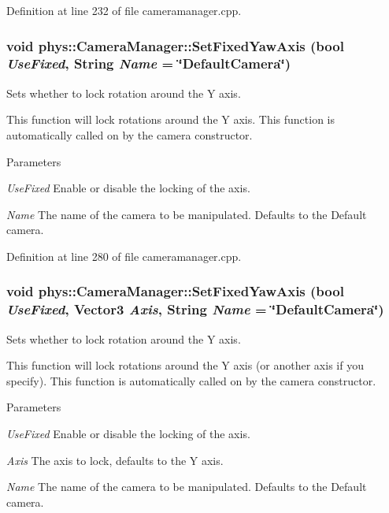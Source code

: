 Definition at line 232 of file cameramanager.cpp.

\hypertarget{classphys_1_1CameraManager_aa7370f2239e88ab151b72c4171afea07}{
\subsubsection[{SetFixedYawAxis}]{\setlength{\rightskip}{0pt plus 5cm}void phys::CameraManager::SetFixedYawAxis (bool {\em UseFixed}, \/  {\bf String} {\em Name} = {\ttfamily \char`\"{}DefaultCamera\char`\"{}})}}
\label{d9/d91/classphys_1_1CameraManager_aa7370f2239e88ab151b72c4171afea07}


Sets whether to lock rotation around the Y axis. 

This function will lock rotations around the Y axis. This function is automatically called on by the camera constructor. 
\begin{DoxyParams}{Parameters}
\item[{\em UseFixed}]Enable or disable the locking of the axis. \item[{\em Name}]The name of the camera to be manipulated. Defaults to the Default camera. \end{DoxyParams}


Definition at line 280 of file cameramanager.cpp.

\hypertarget{classphys_1_1CameraManager_ac29a1b3cd34ff2810bee170aa233c77e}{
\subsubsection[{SetFixedYawAxis}]{\setlength{\rightskip}{0pt plus 5cm}void phys::CameraManager::SetFixedYawAxis (bool {\em UseFixed}, \/  {\bf Vector3} {\em Axis}, \/  {\bf String} {\em Name} = {\ttfamily \char`\"{}DefaultCamera\char`\"{}})}}
\label{d9/d91/classphys_1_1CameraManager_ac29a1b3cd34ff2810bee170aa233c77e}


Sets whether to lock rotation around the Y axis. 

This function will lock rotations around the Y axis (or another axis if you specify). This function is automatically called on by the camera constructor. 
\begin{DoxyParams}{Parameters}
\item[{\em UseFixed}]Enable or disable the locking of the axis. \item[{\em Axis}]The axis to lock, defaults to the Y axis. \item[{\em Name}]The name of the camera to be manipulated. Defaults to the Default camera. \end{DoxyParams}



